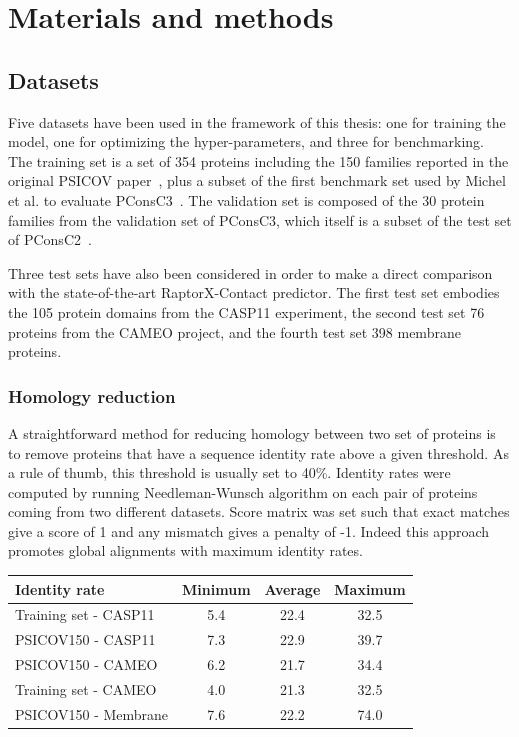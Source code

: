 \chapter{Materials and methods}

\section{Datasets}

  Five datasets have been used in the framework of this thesis:
  one for training the model, one for optimizing the hyper-parameters, and three for benchmarking.
  The training set is a set of 354 proteins including the 150 families reported in the original PSICOV
  paper~\cite{doi:10.1093/bioinformatics/btr638}, plus a subset of the first benchmark set used by
  Michel et al. to evaluate PConsC3~\cite{Skwark079673}.
  The validation set is composed of the 30 protein families from the validation set of PConsC3,
  which itself is a subset of the test set of PConsC2~\cite{10.1371/journal.pcbi.1003889}.

  Three test sets have also been considered in order to make a direct comparison with the state-of-the-art RaptorX-Contact predictor.
  The first test set embodies the 105 protein domains from the CASP11 experiment, the second test set 76 proteins from the CAMEO
  project, and the fourth test set 398 membrane proteins.

  \subsection{Homology reduction}

    A straightforward method for reducing homology between two set of proteins is to
    remove proteins that have a sequence identity rate above a given threshold.
    As a rule of thumb, this threshold is usually set to 40\%.
    Identity rates were computed by running Needleman-Wunsch algorithm on each
    pair of proteins coming from two different datasets. Score matrix was set
    such that exact matches give a score of 1 and any mismatch gives a penalty of -1.
    Indeed this approach promotes global alignments with maximum identity rates.

    \begin{table}[H]
      \centering
      \begin{tabular}{|l|c|c|c|}
        \hline
        Identity rate & Minimum & Average & Maximum \\
        \hline
        \hline
        Training set - CASP11 & 5.4 & 22.4 & 32.5 \\
        PSICOV150 - CASP11 & 7.3 & 22.9 & 39.7 \\
        PSICOV150 - CAMEO & 6.2 & 21.7 & 34.4 \\
        Training set - CAMEO & 4.0 & 21.3 & 32.5 \\
        PSICOV150 - Membrane & 7.6 & 22.2 & 74.0 \\
        \hline
      \end{tabular}
      \label{identityrates}
    \end{table}

